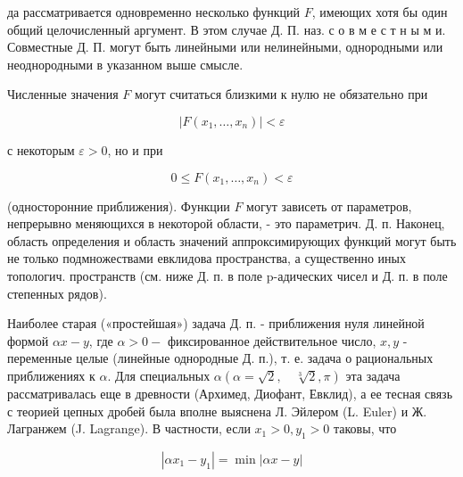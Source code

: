 \documentclass[10pt]{article}
\begin{document}
да рассматривается одновременно несколько функций $F$, имеющих хотя бы один общий целочисленный аргумент. В этом случае Д. П. наз. с о в м е с т н ы м и. Совместные Д. П. могут быть линейными или нелинейными, однородными или неоднородными в указанном выше смысле.



Численные значения $F$ могут считаться близкими к нулю не обязательно при



\[

\left|F\left(x_{1}, \ldots, x_{n}\right)\right|<\varepsilon

\]



с некоторым $\varepsilon>0$, но и при



\[

0 \leqslant F\left(x_{1}, \ldots, x_{n}\right)<\varepsilon

\]



(односторонние приближения). Функции $F$ могут зависеть от параметров, непрерывно меняющихся в некоторой области, - это параметрич. Д. п. Наконец, область определения и область значений аппроксимирующих функций могут быть не только подмножествами евклидова пространства, а существенно иных топологич. пространств (см. ниже Д. п. в поле p-адических чисел и Д. п. в поле степенных рядов).



Наиболее старая («простейшая») задача Д. п. - приближения нуля линейной формой $\alpha x-y$, где $\alpha>0-$ фиксированное действительное число, $x, y$ - переменные целые (линейные однородные Д. п.), т. е. задача о рациональных приближениях к $\alpha$. Для специальных $\alpha(\alpha=\sqrt{2}, \quad \sqrt[3]{2}, \pi)$ эта задача рассматривалась еще в древности (Архимед, Диофант, Евклид), а ее тесная связь с теорией цепных дробей была вполне выяснена Л. Эйлером (L. Euler) и Ж. Лагранжем (J. Lagrange). В частности, если $x_{1}>0, y_{1}>0$ таковы, что



\[

\left|\alpha x_{1}-y_{1}\right|=\min |\alpha x-y|

\]
\end{document}

